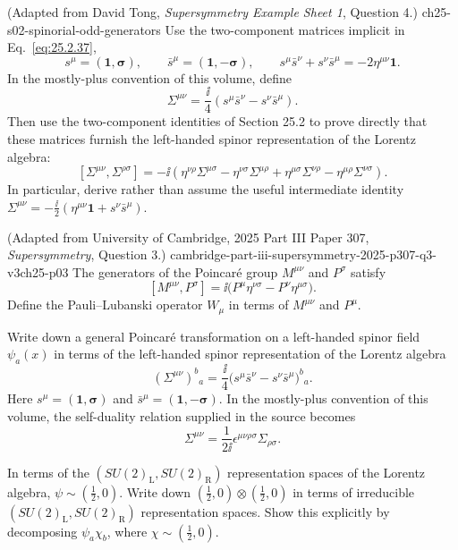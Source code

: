 \begin{enumerate}
    {(Adapted from David Tong, \emph{Supersymmetry Example Sheet 1}, Question 4.)}
    {ch25-s02-spinorial-odd-generators}
Use the two-component matrices implicit in Eq.~\eqref{eq:25.2.37},
  \[
    s^\mu=(\mathbf{1},\boldsymbol{\sigma}),\qquad
    \bar s^\mu=(\mathbf{1},-\boldsymbol{\sigma}),
    \qquad
    s^\mu\bar s^\nu+s^\nu\bar s^\mu
      =-2\eta^{\mu\nu}\mathbf{1} .
  \]
  In the mostly-plus convention of this volume, define
  \[
    \Sigma^{\mu\nu}
      =\frac{\ii}{4}\left(s^\mu\bar s^\nu
                       -s^\nu\bar s^\mu\right).
  \]
  Then use the two-component identities of Section 25.2 to prove directly that
  these matrices furnish the left-handed spinor representation of the
  Lorentz algebra:
  \[
    [\Sigma^{\mu\nu},\Sigma^{\rho\sigma}]
      =-\ii\left(
        \eta^{\nu\rho}\Sigma^{\mu\sigma}
        -\eta^{\nu\sigma}\Sigma^{\mu\rho}
        +\eta^{\mu\sigma}\Sigma^{\nu\rho}
        -\eta^{\mu\rho}\Sigma^{\nu\sigma}
      \right).
  \]
  In particular, derive rather than assume the useful intermediate identity
  \(\Sigma^{\mu\nu}
    =-\tfrac{\ii}{2}(\eta^{\mu\nu}\mathbf{1}
                   +s^\nu\bar s^\mu)\).

    {(Adapted from University of Cambridge, 2025 Part III Paper 307, \emph{Supersymmetry}, Question 3.)}
    {cambridge-part-iii-supersymmetry-2025-p307-q3-v3ch25-p03}
The generators of the Poincar\'e group \(M^{\mu\nu}\) and \(P^\sigma\)
  satisfy
  \[
    [M^{\mu\nu},P^\sigma]
      =\ii\bigl(P^\mu\eta^{\nu\sigma}-P^\nu\eta^{\mu\sigma}\bigr).
  \]
  Define the Pauli--Lubanski operator \(W_\mu\) in terms of
  \(M^{\mu\nu}\) and \(P^\mu\).

  Write down a general Poincar\'e transformation on a left-handed spinor
  field \(\psi_a(x)\) in terms of the left-handed spinor representation of
  the Lorentz algebra
  \[
    (\Sigma^{\mu\nu})^b{}_a
      =\frac{\ii}{4}
        \bigl(s^\mu\bar s^\nu-s^\nu\bar s^\mu\bigr)^b{}_a .
  \]
  Here
  \(s^\mu=(\mathbf 1,\boldsymbol{\sigma})\) and
  \(\bar s^\mu=(\mathbf 1,-\boldsymbol{\sigma})\).  In the mostly-plus
  convention of this volume, the self-duality relation supplied in the
  source becomes
  \[
    \Sigma^{\mu\nu}
      =\frac{1}{2\ii}\epsilon^{\mu\nu\rho\sigma}\Sigma_{\rho\sigma}.
  \]

  In terms of the
  \((SU(2)_{\mathrm L},SU(2)_{\mathrm R})\) representation spaces of the
  Lorentz algebra, \(\psi\sim(\tfrac12,0)\).  Write down
  \((\tfrac12,0)\otimes(\tfrac12,0)\) in terms of irreducible
  \((SU(2)_{\mathrm L},SU(2)_{\mathrm R})\) representation spaces.  Show
  this explicitly by decomposing \(\psi_a\chi_b\), where
  \(\chi\sim(\tfrac12,0)\).


\end{enumerate}
